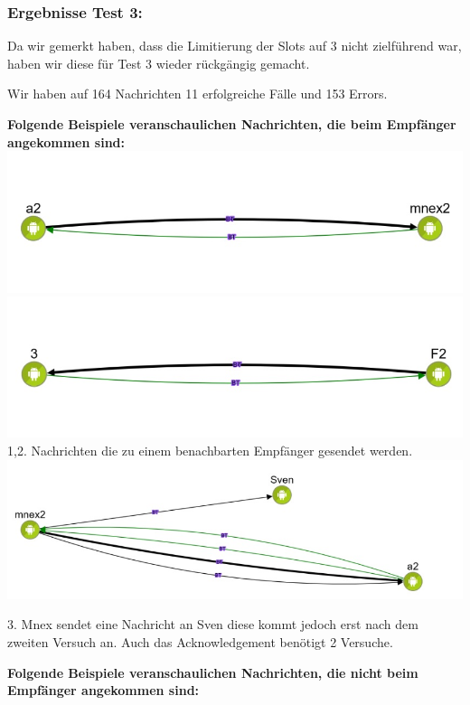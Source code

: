 \subsubsection{Ergebnisse Test 3:}\label{ergebnisse-test-3}

Da wir gemerkt haben, dass die Limitierung der Slots auf 3 nicht
zielführend war, haben wir diese für Test 3 wieder rückgängig gemacht.

Wir haben auf 164 Nachrichten 11 erfolgreiche Fälle und 153 Errors.

\textbf{Folgende Beispiele veranschaulichen Nachrichten, die beim
Empfänger angekommen sind:}
\includegraphics[width=1.0\textwidth]{belege/grosstests/Bilder/Grosstest2/Test3Erfolg1.jpg}
\includegraphics[width=1.0\textwidth]{belege/grosstests/Bilder/Grosstest2/Test3Erfolg2.jpg}
1,2. Nachrichten die zu einem benachbarten Empfänger gesendet werden.
\includegraphics[width=1.0\textwidth]{belege/grosstests/Bilder/Grosstest2/Test3Erfolg3.jpg}

3. Mnex sendet eine Nachricht an Sven diese kommt jedoch erst nach dem
zweiten Versuch an. Auch das Acknowledgement benötigt 2 Versuche.

\textbf{Folgende Beispiele veranschaulichen Nachrichten, die nicht beim
Empfänger angekommen sind:}


